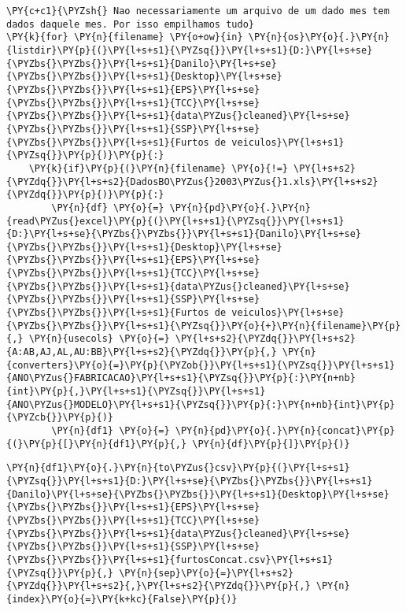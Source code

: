     \begin{tcolorbox}[breakable, size=fbox, boxrule=1pt, pad at break*=1mm,colback=cellbackground, colframe=cellborder]
\begin{Verbatim}[commandchars=\\\{\}]
\PY{c+c1}{\PYZsh{} Nao necessariamente um arquivo de um dado mes tem dados daquele mes. Por isso empilhamos tudo}
\PY{k}{for} \PY{n}{filename} \PY{o+ow}{in} \PY{n}{os}\PY{o}{.}\PY{n}{listdir}\PY{p}{(}\PY{l+s+s1}{\PYZsq{}}\PY{l+s+s1}{D:}\PY{l+s+se}{\PYZbs{}\PYZbs{}}\PY{l+s+s1}{Danilo}\PY{l+s+se}{\PYZbs{}\PYZbs{}}\PY{l+s+s1}{Desktop}\PY{l+s+se}{\PYZbs{}\PYZbs{}}\PY{l+s+s1}{EPS}\PY{l+s+se}{\PYZbs{}\PYZbs{}}\PY{l+s+s1}{TCC}\PY{l+s+se}{\PYZbs{}\PYZbs{}}\PY{l+s+s1}{data\PYZus{}cleaned}\PY{l+s+se}{\PYZbs{}\PYZbs{}}\PY{l+s+s1}{SSP}\PY{l+s+se}{\PYZbs{}\PYZbs{}}\PY{l+s+s1}{Furtos de veiculos}\PY{l+s+s1}{\PYZsq{}}\PY{p}{)}\PY{p}{:}
    \PY{k}{if}\PY{p}{(}\PY{n}{filename} \PY{o}{!=} \PY{l+s+s2}{\PYZdq{}}\PY{l+s+s2}{DadosBO\PYZus{}2003\PYZus{}1.xls}\PY{l+s+s2}{\PYZdq{}}\PY{p}{)}\PY{p}{:}
        \PY{n}{df} \PY{o}{=} \PY{n}{pd}\PY{o}{.}\PY{n}{read\PYZus{}excel}\PY{p}{(}\PY{l+s+s1}{\PYZsq{}}\PY{l+s+s1}{D:}\PY{l+s+se}{\PYZbs{}\PYZbs{}}\PY{l+s+s1}{Danilo}\PY{l+s+se}{\PYZbs{}\PYZbs{}}\PY{l+s+s1}{Desktop}\PY{l+s+se}{\PYZbs{}\PYZbs{}}\PY{l+s+s1}{EPS}\PY{l+s+se}{\PYZbs{}\PYZbs{}}\PY{l+s+s1}{TCC}\PY{l+s+se}{\PYZbs{}\PYZbs{}}\PY{l+s+s1}{data\PYZus{}cleaned}\PY{l+s+se}{\PYZbs{}\PYZbs{}}\PY{l+s+s1}{SSP}\PY{l+s+se}{\PYZbs{}\PYZbs{}}\PY{l+s+s1}{Furtos de veiculos}\PY{l+s+se}{\PYZbs{}\PYZbs{}}\PY{l+s+s1}{\PYZsq{}}\PY{o}{+}\PY{n}{filename}\PY{p}{,} \PY{n}{usecols} \PY{o}{=} \PY{l+s+s2}{\PYZdq{}}\PY{l+s+s2}{A:AB,AJ,AL,AU:BB}\PY{l+s+s2}{\PYZdq{}}\PY{p}{,} \PY{n}{converters}\PY{o}{=}\PY{p}{\PYZob{}}\PY{l+s+s1}{\PYZsq{}}\PY{l+s+s1}{ANO\PYZus{}FABRICACAO}\PY{l+s+s1}{\PYZsq{}}\PY{p}{:}\PY{n+nb}{int}\PY{p}{,}\PY{l+s+s1}{\PYZsq{}}\PY{l+s+s1}{ANO\PYZus{}MODELO}\PY{l+s+s1}{\PYZsq{}}\PY{p}{:}\PY{n+nb}{int}\PY{p}{\PYZcb{}}\PY{p}{)}
        \PY{n}{df1} \PY{o}{=} \PY{n}{pd}\PY{o}{.}\PY{n}{concat}\PY{p}{(}\PY{p}{[}\PY{n}{df1}\PY{p}{,} \PY{n}{df}\PY{p}{]}\PY{p}{)}
\end{Verbatim}
\end{tcolorbox}

    \begin{tcolorbox}[breakable, size=fbox, boxrule=1pt, pad at break*=1mm,colback=cellbackground, colframe=cellborder]
\begin{Verbatim}[commandchars=\\\{\}]
\PY{n}{df1}\PY{o}{.}\PY{n}{to\PYZus{}csv}\PY{p}{(}\PY{l+s+s1}{\PYZsq{}}\PY{l+s+s1}{D:}\PY{l+s+se}{\PYZbs{}\PYZbs{}}\PY{l+s+s1}{Danilo}\PY{l+s+se}{\PYZbs{}\PYZbs{}}\PY{l+s+s1}{Desktop}\PY{l+s+se}{\PYZbs{}\PYZbs{}}\PY{l+s+s1}{EPS}\PY{l+s+se}{\PYZbs{}\PYZbs{}}\PY{l+s+s1}{TCC}\PY{l+s+se}{\PYZbs{}\PYZbs{}}\PY{l+s+s1}{data\PYZus{}cleaned}\PY{l+s+se}{\PYZbs{}\PYZbs{}}\PY{l+s+s1}{SSP}\PY{l+s+se}{\PYZbs{}\PYZbs{}}\PY{l+s+s1}{furtosConcat.csv}\PY{l+s+s1}{\PYZsq{}}\PY{p}{,} \PY{n}{sep}\PY{o}{=}\PY{l+s+s2}{\PYZdq{}}\PY{l+s+s2}{,}\PY{l+s+s2}{\PYZdq{}}\PY{p}{,} \PY{n}{index}\PY{o}{=}\PY{k+kc}{False}\PY{p}{)}
\end{Verbatim}
\end{tcolorbox}

